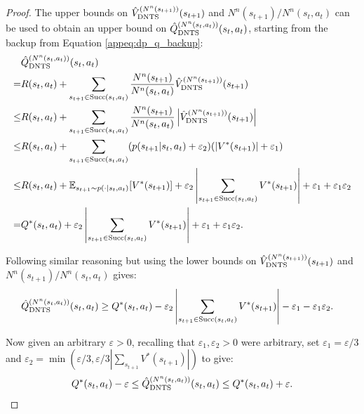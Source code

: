 \begin{proof}
        The upper bounds on ${\hat{V}^{(N^n(s_{t+1}))}_{{\textnormal{DNTS}}}}(s_{t+1})$ and $N^n(s_{t+1})/N^n(s_t,a_t)$ can be used to obtain an upper bound on ${\hat{Q}^{(N^n(s_t,a_t))}_{{\textnormal{DNTS}}}}(s_t,a_t)$, starting from the backup from Equation \eqref{appeq:dp_q_backup}:
        \begin{align}
            &{\hat{Q}^{(N^n(s_t,a_t))}_{{\textnormal{DNTS}}}}(s_t,a_t) \\
                =& R(s_t,a_t)
                    + \sum_{s_{t+1}\in{\textnormal{Succ}(s_t,a_t)}}\frac{N^n(s_{t+1})}{N^n(s_t,a_t)}
                        {\hat{V}^{(N^n(s_{t+1}))}_{{\textnormal{DNTS}}}}(s_{t+1}) \\
                \leq& R(s_t,a_t)
                    + \sum_{s_{t+1}\in{\textnormal{Succ}(s_t,a_t)}}\frac{N^n(s_{t+1})}{N^n(s_t,a_t)}
                        \left|{\hat{V}^{(N^n(s_{t+1}))}_{{\textnormal{DNTS}}}}(s_{t+1})\right| \\
                \leq& R(s_t,a_t)
                    + \sum_{s_{t+1}\in{\textnormal{Succ}(s_t,a_t)}}(p(s_{t+1}|s_t,a_t)+\varepsilon_2)
                        (\left|V^*(s_{t+1})\right|+\varepsilon_1) \\
                \leq& R(s_t,a_t)
                    + \mathbb{E}_{s_{t+1}\sim p(\cdot|s_t,a_t)}[V^*(s_{t+1})]
                    + \varepsilon_2\left|\sum_{s_{t+1}\in{\textnormal{Succ}(s_t,a_t)}} V^*(s_{t+1})\right|
                    + \varepsilon_1 + \varepsilon_1 \varepsilon_2 \\
                =& Q^*(s_t,a_t)
                    + \varepsilon_2\left|\sum_{s_{t+1}\in{\textnormal{Succ}(s_t,a_t)}} V^*(s_{t+1})\right|
                    + \varepsilon_1
                    + \varepsilon_1 \varepsilon_2.
        \end{align}

        Following similar reasoning but using the lower bounds on ${\hat{V}^{(N^n(s_{t+1}))}_{{\textnormal{DNTS}}}}(s_{t+1})$ and $N^n(s_{t+1})/N^n(s_t,a_t)$ gives:
        \begin{align}
            {\hat{Q}^{(N^n(s_t,a_t))}_{{\textnormal{DNTS}}}}(s_t,a_t)
                &\geq Q^*(s_t,a_t)
                    - \varepsilon_2\left|\sum_{s_{t+1}\in{\textnormal{Succ}(s_t,a_t)}} V^*(s_{t+1})\right|
                    - \varepsilon_1
                    - \varepsilon_1 \varepsilon_2.
        \end{align}

        Now given an arbitrary $\varepsilon >0$, recalling that $\varepsilon_1,\varepsilon_2>0$ were arbitrary, set $\varepsilon_1 = \varepsilon/3$ and $\varepsilon_2 = \min(\varepsilon/3, \varepsilon/3|\sum_{s_{t+1}} V^*(s_{t+1})|)$ to give:
        \begin{align}
            Q^*(s_t,a_t) - \varepsilon \leq {\hat{Q}^{(N^n(s_t,a_t))}_{{\textnormal{DNTS}}}}(s_t,a_t) \leq Q^*(s_t,a_t) + \varepsilon.
        \end{align}
        

\end{proof}
